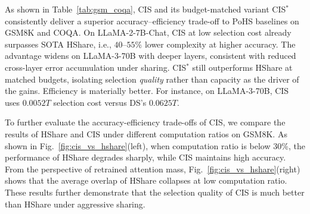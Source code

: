 As shown in Table~\ref{tab:gsm_coqa}, CIS and its budget-matched variant CIS$^\ast$ consistently deliver a superior accuracy–efficiency trade-off to PoHS baselines on GSM8K and COQA. On LLaMA-2-7B-Chat, CIS at low selection cost already surpasses SOTA HShare, i.e., $40$–$55\%$ lower complexity at higher accuracy. The advantage widens on LLaMA-3-70B with deeper layers, consistent with reduced cross-layer error accumulation under sharing. CIS$^\ast$ still outperforms HShare at matched budgets, isolating selection \emph{quality} rather than capacity as the driver of the gains. Efficiency is materially better. For instance, on LLaMA-3-70B, CIS uses $0.0052T$ selection cost versus DS’s $0.0625T$.


To further evaluate the accuracy-efficiency trade-offs of CIS, we compare the results of HShare and CIS under different computation ratios on GSM8K. As shown in Fig.~\ref{fig:cis_vs_hshare}(left), when computation ratio is below 30\%, the performance of HShare degrades sharply, while CIS maintains high accuracy. From the perspective of retrained attention mass, Fig.~\ref{fig:cis_vs_hshare}(right) shows that the average overlap of HShare collapses at low computation ratio. These results further demonstrate that the selection quality of CIS is much better than HShare under aggressive sharing.



